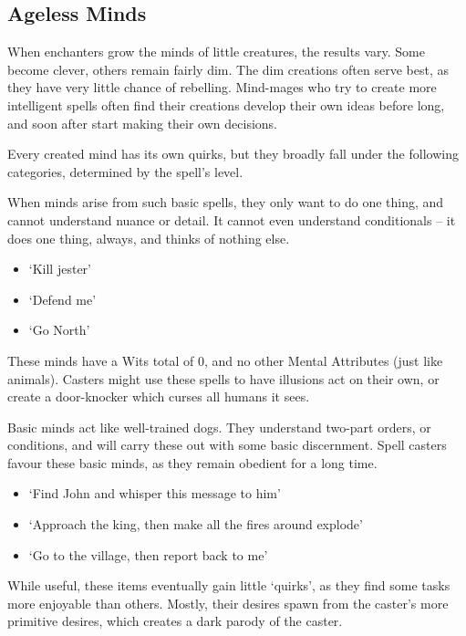 \begin{multicols}{2}

\subsection{Ageless Minds}
When enchanters grow the minds of little creatures, the results vary.
Some become clever, others remain fairly dim.
The dim creations often serve best, as they have very little chance of rebelling.
Mind-mages who try to create more intelligent spells often find their creations develop their own ideas before long, and soon after start making their own decisions.

Every created mind has its own quirks, but they broadly fall under the following categories, determined by the spell's level.


When minds arise from such basic spells, they only want to do one thing, and cannot understand nuance or detail.
It cannot even understand conditionals -- it does one thing, always, and thinks of nothing else.

\begin{itemize}
  \item
    `Kill jester'
  \item
    `Defend me'
  \item
    `Go North'
\end{itemize}

These minds have a Wits total of 0, and no other Mental Attributes (just like animals).
Casters might use these spells to have illusions act on their own, or create a door-knocker which curses all humans it sees.


Basic minds act like well-trained dogs.
They understand two-part orders, or conditions, and will carry these out with some basic discernment.
Spell casters favour these basic minds, as they remain obedient for a long time.

\begin{itemize}
  \item
    `Find John and whisper this message to him'
  \item
    `Approach the king, then make all the fires around explode'
  \item
    `Go to the village, then report back to me'
\end{itemize}

While useful, these items eventually gain little `quirks', as they find some tasks more enjoyable than others.
Mostly, their desires spawn from the caster's more primitive desires, which creates a dark parody of the caster.


\end{multicols}
